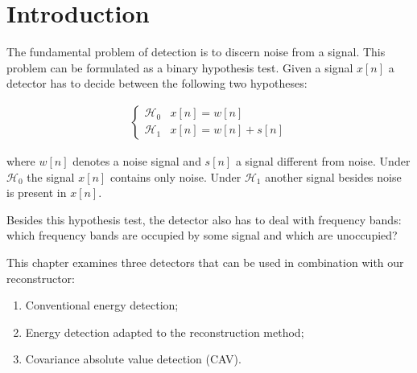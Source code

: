 \documentclass[a4paper, openany, oneside]{memoir}
\begin{document}
\section{Introduction}
The fundamental problem of detection is to discern noise from a signal. This problem can be formulated as a binary hypothesis test. Given a signal $x[n]$ a detector has to decide between the following two hypotheses:

\begin{align*}
	\begin{cases}
		\mathcal{H}_0 & x[n] = w[n] \\
		\mathcal{H}_1 & x[n] = w[n] + s[n]
	\end{cases}
\end{align*}

where $w[n]$ denotes a noise signal and $s[n]$ a signal different from noise. Under $\mathcal{H}_0$ the signal $x[n]$ contains only noise. Under $\mathcal{H}_1$ another signal besides noise is present in $x[n]$.

Besides this hypothesis test, the detector also has to deal with frequency bands: which frequency bands are occupied by some signal and which are unoccupied?

This chapter examines three detectors that can be used in combination with our reconstructor:

\begin{enumerate}
	\item Conventional energy detection;
	\item Energy detection adapted to the reconstruction method;  
	\item Covariance absolute value detection (CAV).
\end{enumerate}

\end{document}
